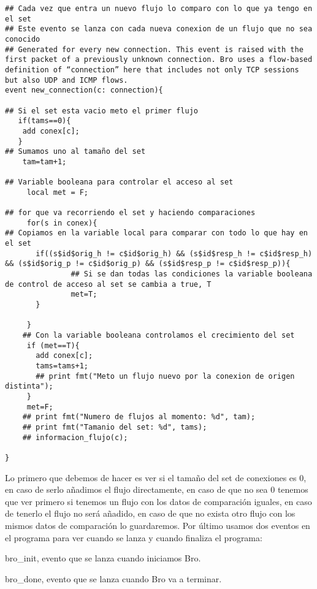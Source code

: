 \intro
\begin{lstlisting}[language=Consola]
## Cada vez que entra un nuevo flujo lo comparo con lo que ya tengo en el set
## Este evento se lanza con cada nueva conexion de un flujo que no sea conocido
## Generated for every new connection. This event is raised with the first packet of a previously unknown connection. Bro uses a flow-based definition of “connection” here that includes not only TCP sessions but also UDP and ICMP flows.
event new_connection(c: connection){

## Si el set esta vacio meto el primer flujo
   if(tams==0){
    add conex[c];
   }
## Sumamos uno al tamaño del set
    tam=tam+1;

## Variable booleana para controlar el acceso al set
     local met = F;

## for que va recorriendo el set y haciendo comparaciones
     for(s in conex){
## Copiamos en la variable local para comparar con todo lo que hay en el set
       if((s$id$orig_h != c$id$orig_h) && (s$id$resp_h != c$id$resp_h) && (s$id$orig_p != c$id$orig_p) && (s$id$resp_p != c$id$resp_p)){
               ## Si se dan todas las condiciones la variable booleana de control de acceso al set se cambia a true, T
               met=T;
       }

     }
    ## Con la variable booleana controlamos el crecimiento del set
     if (met==T){
       add conex[c];
       tams=tams+1;
       ## print fmt("Meto un flujo nuevo por la conexion de origen distinta");
     }
     met=F;
    ## print fmt("Numero de flujos al momento: %d", tam);
    ## print fmt("Tamanio del set: %d", tams);
    ## informacion_flujo(c);

}
\end{lstlisting}
\intro
Lo primero que debemos de hacer es ver si el tamaño del set de 
conexiones es 0, en caso de serlo añadimos el flujo directamente, 
en caso de que no sea 0 tenemos que ver primero si tenemos un flujo 
con los datos de comparación iguales, en caso de tenerlo el flujo 
no será añadido, en caso de que no exista otro flujo con los mismos 
datos de comparación lo guardaremos.
\intro
Por último usamos dos eventos en el programa para ver cuando se 
lanza y cuando finaliza el programa:
\intro
\begin{itemsize}
\item bro_init, evento que se lanza cuando iniciamos Bro.
\item bro_done, evento que se lanza cuando Bro va a terminar.
\end{itemsize}
